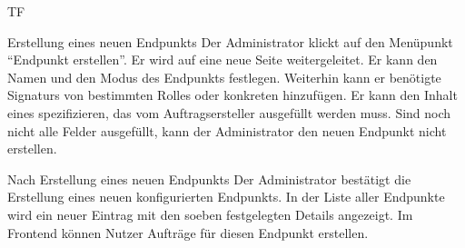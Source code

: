 \begin{Kriterien}{TF}
	\item[Erstellung eines neuen Endpunkts] Der Administrator klickt auf den Menüpunkt \enquote{Endpunkt erstellen}. \ergebnis Er wird auf eine neue Seite weitergeleitet. Er kann den Namen und den \gls{Modus} des Endpunkts festlegen. Weiterhin kann er benötigte \glspl{Signatur} von bestimmten \glspl{Rolle} oder konkreten  hinzufügen. Er kann den Inhalt eines  spezifizieren, das vom Auftragsersteller ausgefüllt werden muss. Sind noch nicht alle Felder ausgefüllt, kann der Administrator den neuen Endpunkt nicht erstellen.

    \item[Nach Erstellung eines neuen Endpunkts] Der Administrator bestätigt die Erstellung eines neuen konfigurierten Endpunkts. \ergebnis In der Liste aller Endpunkte wird ein neuer Eintrag mit den soeben festgelegten Details angezeigt. Im Frontend können Nutzer Aufträge für diesen Endpunkt erstellen.

\end{Kriterien}

